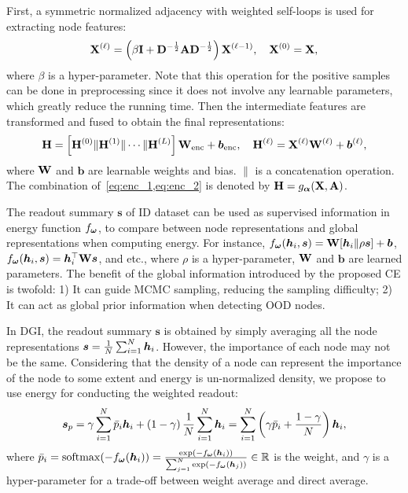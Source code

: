 First, a symmetric normalized adjacency with weighted self-loops is used for extracting node features: 
\begin{equation}
\begin{aligned}
    \mathbf{X}^{(\ell)} = \left( \beta \I + \D^{-\frac{1}{2}}\A\D^{-\frac{1}{2}} \right) \mathbf{X}^{(\ell-1)}, \ \ \ 
    \mathbf{X}^{(0)} = \mathbf{X}, 
    \label{eq:enc_1}
\end{aligned}
\end{equation}
where $\beta$ is a hyper-parameter. 
Note that this operation for the positive samples can be done in preprocessing since it does not involve any learnable parameters, which greatly reduce the running time. 
Then the intermediate features are transformed and fused to obtain the final representations: 
\begin{equation}
\begin{aligned}
    \mathbf{H} = \left[ \mathbf{H}^{(0)} \| \mathbf{H}^{(1)} \| \cdots \| \mathbf{H}^{(L)} \right] \mathbf{W}_{\text{enc}} + \bm{b}_{\text{enc}}, \ \ \ \mathbf{H}^{(\ell)} = \mathbf{X}^{(\ell)}\mathbf{W}^{(\ell)} + \bm{b}^{(\ell)}, 
    \label{eq:enc_2}
\end{aligned}
\end{equation}
where $\mathbf{W}$ and $\bm{b}$ are learnable weights and bias. $\|$ is a concatenation operation. 
The combination of~\cref{eq:enc_1,eq:enc_2} is denoted by $\mathbf{H} = g_{\bm{\alpha}}(\mathbf{X}, \mathbf{A})$. 

The readout summary $\bm{s}$ of ID dataset can be used as supervised information in energy function $f_{{\bm{\omega}}}$, to compare between node representations and global representations when computing energy. 
For instance, $f_{{\bm{\omega}}} ({\bm{h}}_i, \bm{s}) = \mathbf{W}[{\bm{h}}_i \| \rho\bm{s}]+\bm{b} $, $f_{{\bm{\omega}}} ({\bm{h}}_i, \bm{s}) = {\bm{h}}_i^{\top} \mathbf{W} \bm{s}$, and etc., 
where $\rho$ is a hyper-parameter, $\mathbf{W}$ and $\bm{b}$ are learned parameters. The benefit of the global information introduced by the proposed CE is twofold: 1) It can guide MCMC sampling, reducing the sampling difficulty; 2) It can act as global prior information when detecting OOD nodes.


In DGI, the readout summary $\bm{s}$ is obtained by simply averaging all the node representations $\bm{s} = \frac{1}{N}\sum_{i=1}^{N}{\bm{h}}_i$. 
However, the importance of each node may not be the same. Considering that the density of a node can represent the importance of the node to some extent and energy is un-normalized density, we propose to use energy for conducting the weighted readout:
\begin{equation}
\begin{aligned}
    \notag
    \bm{s}_p = \gamma\sum_{i=1}^{N}\bar{p}_i {\bm{h}}_i + \left(1-\gamma\right)\frac{1}{N}\sum_{i=1}^{N}{\bm{h}}_i
    =  \sum_{i=1}^{N} \left( \gamma\bar{p}_i + \frac{1-\gamma}{N} \right) {\bm{h}}_i, 
\end{aligned}
\end{equation}
where 
$\bar{p}_i = \operatorname{softmax} ( -f_{{\bm{\omega}}} ({\bm{h}}_i) ) = \frac{\exp(-f_{{\bm{\omega}}} ({\bm{h}}_i))}{\sum_{j=1}^{N}\exp(-f_{{\bm{\omega}}} ({\bm{h}}_j))}\in\mathbb{R}$ is the weight, 
and $\gamma$ is a hyper-parameter for a trade-off between weight average and direct average. 


